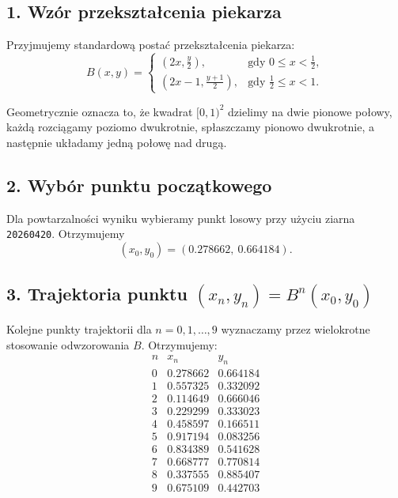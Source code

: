 \documentclass[11pt,a4paper]{article}
\theoremstyle{plain}
\theoremstyle{definition}
\begin{document}
\begin{rozwiazaniebox}
\subsection*{1. Wz\'or przekszta\l cenia piekarza}

Przyjmujemy standardow\k{a} posta\'c przekszta\l cenia piekarza:
\[
B(x,y)=
\begin{cases}
(2x,\tfrac{y}{2}), & \text{gdy } 0 \le x < \tfrac{1}{2},\\[0.3em]
(2x-1,\tfrac{y+1}{2}), & \text{gdy } \tfrac{1}{2} \le x < 1.
\end{cases}
\]

Geometrycznie oznacza to, \.ze kwadrat \([0,1)^2\) dzielimy na dwie pionowe po\l owy, ka\.zd\k{a}
rozci\k{a}gamy poziomo dwukrotnie, sp\l aszczamy pionowo dwukrotnie, a nast\k{e}pnie uk\l adamy jedn\k{a}
po\l ow\k{e} nad drug\k{a}.

\subsection*{2. Wyb\'or punktu pocz\k{a}tkowego}

Dla powtarzalno\'sci wyniku wybieramy punkt losowy przy u\.zyciu ziarna \texttt{20260420}. Otrzymujemy
\[
    (x_0,y_0)=(0.278662,\ 0.664184).
\]

\subsection*{3. Trajektoria punktu \((x_n,y_n)=B^n(x_0,y_0)\)}

Kolejne punkty trajektorii dla \(n=0,1,\dots,9\) wyznaczamy przez wielokrotne stosowanie odwzorowania
\(B\). Otrzymujemy:
\[
\begin{array}{c|cc}
n & x_n & y_n \\ \hline
0 & 0.278662 & 0.664184 \\
1 & 0.557325 & 0.332092 \\
2 & 0.114649 & 0.666046 \\
3 & 0.229299 & 0.333023 \\
4 & 0.458597 & 0.166511 \\
5 & 0.917194 & 0.083256 \\
6 & 0.834389 & 0.541628 \\
7 & 0.668777 & 0.770814 \\
8 & 0.337555 & 0.885407 \\
9 & 0.675109 & 0.442703
\end{array}
\]


\end{rozwiazaniebox}
\end{document}
